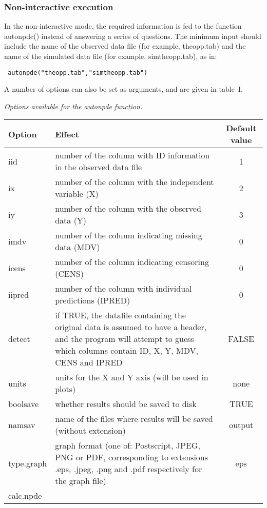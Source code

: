 \subsubsection{Non-interactive execution}

\hskip 18pt In the non-interactive mode, the required information is fed to the function {\sf autonpde()} instead 
of answering a series of questions. The minimum input should include the name of the observed data file (for 
example, {\sf theopp.tab}) and the name of the simulated data file (for example, {\sf simtheopp.tab}), as in: 
\begin{verbatim} autonpde("theopp.tab","simtheopp.tab") \end{verbatim} A number of options can also be set as 
arguments, and are given in table~I. \begin{table}[!h]  {\itshape Options available 
for the autonpde function.} \begin{center} \begin{tabular} {l p{8cm} c} \hline \textbf{Option} & \textbf{Effect} & 
\textbf{Default value} \\ \hline iid & number of the column with ID information in the observed data file & 1 \\ ix 
& number of the column with the independent variable (X) & 2 \\ iy & number of the column with the observed data 
(Y) & 3 \\ imdv & number of the column indicating missing data (MDV) & 0 \\ icens & number of the column indicating 
censoring (CENS) & 0 \\ iipred & number of the column with individual predictions (IPRED) & 0 \\ detect & if TRUE, 
the datafile containing the original data is assumed to have a header, and the program will attempt to guess which 
columns contain ID, X, Y, MDV, CENS and IPRED & FALSE \\ units & units for the X and Y axis (will be used in plots) 
& none \\ boolsave & whether results should be saved to disk & TRUE \\ namsav & name of the files where results 
will be saved (without extension) & output\\ type.graph & graph format (one of: Postscript, JPEG, PNG or PDF, 
corresponding to extensions .eps, .jpeg, .png and .pdf respectively for the graph file) & eps \\ calc.npde & 

\end{tabular}
\end{center}
\end{table}
